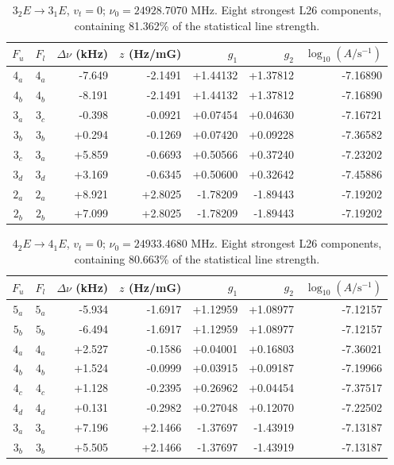 \begin{table}[!htbp]
\centering\small\renewcommand{\arraystretch}{1.1}\setlength{\tabcolsep}{5pt}
\caption{$3_{2} E\rightarrow 3_{1} E$, $v_t=0$; $\nu_0=24928.7070$ MHz. Eight strongest L26 components, containing 81.362\% of the statistical line strength.}
\label{tab:sm-zeeman-24p929}
\begin{tabular}{ccrrrrr}
\hline\hline
$F_u$ & $F_l$ & $\Delta\nu$ (kHz) & $z$ (Hz/mG) & $g_1$ & $g_2$ & $\log_{10}(A/\mathrm{s}^{-1})$ \\
\hline
$4_{a}$ & $4_{a}$ & -7.649 & -2.1491 & +1.44132 & +1.37812 & -7.16890\\
$4_{b}$ & $4_{b}$ & -8.191 & -2.1491 & +1.44132 & +1.37812 & -7.16890\\
$3_{a}$ & $3_{c}$ & -0.398 & -0.0921 & +0.07454 & +0.04630 & -7.16721\\
$3_{b}$ & $3_{b}$ & +0.294 & -0.1269 & +0.07420 & +0.09228 & -7.36582\\
$3_{c}$ & $3_{a}$ & +5.859 & -0.6693 & +0.50566 & +0.37240 & -7.23202\\
$3_{d}$ & $3_{d}$ & +3.169 & -0.6345 & +0.50600 & +0.32642 & -7.45886\\
$2_{a}$ & $2_{a}$ & +8.921 & +2.8025 & -1.78209 & -1.89443 & -7.19202\\
$2_{b}$ & $2_{b}$ & +7.099 & +2.8025 & -1.78209 & -1.89443 & -7.19202\\
\hline\end{tabular}
\end{table}

\begin{table}[!htbp]
\centering\small\renewcommand{\arraystretch}{1.1}\setlength{\tabcolsep}{5pt}
\caption{$4_{2} E\rightarrow 4_{1} E$, $v_t=0$; $\nu_0=24933.4680$ MHz. Eight strongest L26 components, containing 80.663\% of the statistical line strength.}
\label{tab:sm-zeeman-24p933}
\begin{tabular}{ccrrrrr}
\hline\hline
$F_u$ & $F_l$ & $\Delta\nu$ (kHz) & $z$ (Hz/mG) & $g_1$ & $g_2$ & $\log_{10}(A/\mathrm{s}^{-1})$ \\
\hline
$5_{a}$ & $5_{a}$ & -5.934 & -1.6917 & +1.12959 & +1.08977 & -7.12157\\
$5_{b}$ & $5_{b}$ & -6.494 & -1.6917 & +1.12959 & +1.08977 & -7.12157\\
$4_{a}$ & $4_{a}$ & +2.527 & -0.1586 & +0.04001 & +0.16803 & -7.36021\\
$4_{b}$ & $4_{b}$ & +1.524 & -0.0999 & +0.03915 & +0.09187 & -7.19966\\
$4_{c}$ & $4_{c}$ & +1.128 & -0.2395 & +0.26962 & +0.04454 & -7.37517\\
$4_{d}$ & $4_{d}$ & +0.131 & -0.2982 & +0.27048 & +0.12070 & -7.22502\\
$3_{a}$ & $3_{a}$ & +7.196 & +2.1466 & -1.37697 & -1.43919 & -7.13187\\
$3_{b}$ & $3_{b}$ & +5.505 & +2.1466 & -1.37697 & -1.43919 & -7.13187\\
\hline\end{tabular}
\end{table}

